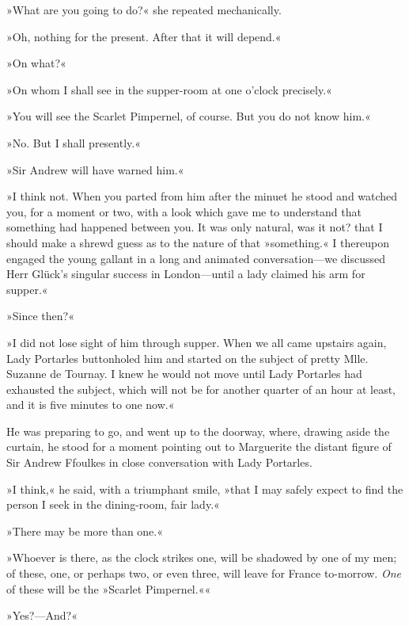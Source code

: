 »What are you going to do?« she repeated mechanically.

»Oh, nothing for the present. After that it will depend.«

»On what?«

»On whom I shall see in the supper-room at one o'clock precisely.«

»You will see the Scarlet Pimpernel, of course. But you do not know him.«

»No. But I shall presently.«

»Sir Andrew will have warned him.«

»I think not. When you parted from him after the minuet he stood and watched you, for a moment or two, with a look which gave me to understand that something had happened between you. It was only natural, was it not? that I should make a shrewd guess as to the nature of that »something.« I thereupon engaged the young gallant in a long and animated conversation\allowbreak---\allowbreak we discussed Herr Glück's singular success in London\allowbreak---\allowbreak until a lady claimed his arm for supper.«

»Since then?«

»I did not lose sight of him through supper. When we all came upstairs again, Lady Portarles buttonholed him and started on the subject of pretty Mlle. Suzanne de Tournay. I knew he would not move until Lady Portarles had exhausted the subject, which will not be for another quarter of an hour at least, and it is five minutes to one now.«

He was preparing to go, and went up to the doorway, where, drawing aside the curtain, he stood for a moment pointing out to Marguerite the distant figure of Sir Andrew Ffoulkes in close conversation with Lady Portarles.

»I think,« he said, with a triumphant smile, »that I may safely expect to find the person I seek in the dining-room, fair lady.«

»There may be more than one.«

»Whoever is there, as the clock strikes one, will be shadowed by one of my men; of these, one, or perhaps two, or even three, will leave for France to-morrow. \textit{One} of these will be the »Scarlet Pimpernel.««

»Yes?\allowbreak---\allowbreak And?«

